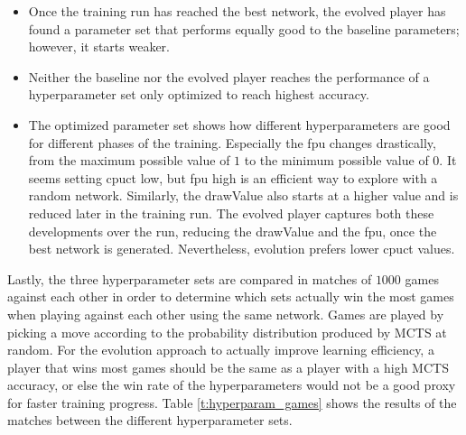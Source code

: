 \documentclass[12pt,onecolumn,oneside,titlepage]{article}
\begin{document}
\begin{itemize}
 \item Once the training run has reached the best network, the evolved player has found a parameter set that performs equally good to the baseline parameters; however, it starts weaker.
 \item Neither the baseline nor the evolved player reaches the performance of a hyperparameter set only optimized to reach highest accuracy.
 \item The optimized parameter set shows how different hyperparameters are good for different phases of the training. 
 Especially the fpu changes drastically, from the maximum possible value of $1$ to the minimum possible value of $0$. It seems
 setting cpuct low, but fpu high is an efficient way to explore with a random network. Similarly, the drawValue also starts at a higher value and is reduced later in the training run. 
 The evolved player captures both these developments over the run,
 reducing the drawValue and the fpu, once the best network is generated. Nevertheless, evolution prefers lower cpuct values.
\end{itemize}

Lastly, the three hyperparameter sets are compared in matches of $1000$ games against each other in order 
to determine which sets actually win the most games when playing against each other using the same network. Games are played by picking a move according
to the probability distribution produced by MCTS at random.
For the evolution approach to actually improve learning efficiency, a player that wins most games should be the same as a player with a high MCTS accuracy, 
or else the win rate of the hyperparameters would not be a good proxy for faster training progress.
Table \ref{t:hyperparam_games} shows the results of the matches between the different hyperparameter sets.
\end{document}
